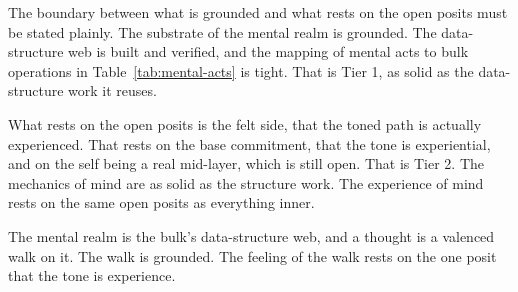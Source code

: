 The boundary between what is grounded and what rests on the open posits must be stated plainly. The substrate of the mental realm is grounded. The data-structure web is built and verified, and the mapping of mental acts to bulk operations in Table~\ref{tab:mental-acts} is tight. That is Tier 1, as solid as the data-structure work it reuses.

What rests on the open posits is the felt side, that the toned path is actually experienced. That rests on the base commitment, that the tone is experiential, and on the self being a real mid-layer, which is still open. That is Tier 2. The mechanics of mind are as solid as the structure work. The experience of mind rests on the same open posits as everything inner.

\begin{result}
The mental realm is the bulk's data-structure web, and a thought is a valenced walk on it. The walk is grounded. The feeling of the walk rests on the one posit that the tone is experience.
\end{result}

